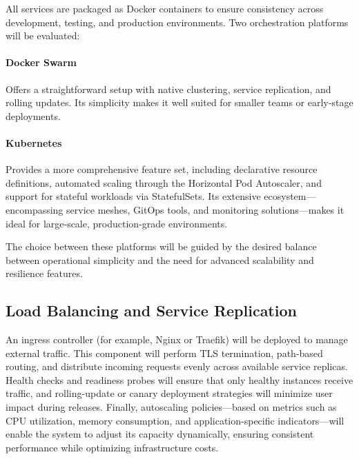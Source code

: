 All services are packaged as Docker containers to ensure consistency across development, testing, and production environments. Two orchestration platforms will be evaluated:

\paragraph{Docker Swarm}  
Offers a straightforward setup with native clustering, service replication, and rolling updates. Its simplicity makes it well suited for smaller teams or early‐stage deployments.

\paragraph{Kubernetes}  
Provides a more comprehensive feature set, including declarative resource definitions, automated scaling through the Horizontal Pod Autoscaler, and support for stateful workloads via StatefulSets. Its extensive ecosystem—encompassing service meshes, GitOps tools, and monitoring solutions—makes it ideal for large‐scale, production‐grade environments.

The choice between these platforms will be guided by the desired balance between operational simplicity and the need for advanced scalability and resilience features.

\subsection{Load Balancing and Service Replication}

An ingress controller (for example, Nginx\cite{NGINX} or Traefik\cite{NGINX}) will be deployed to manage external traffic. This component will perform TLS termination, path-based routing, and distribute incoming requests evenly across available service replicas. Health checks and readiness probes will ensure that only healthy instances receive traffic, and rolling-update or canary deployment strategies will minimize user impact during releases. Finally, autoscaling policies—based on metrics such as CPU utilization, memory consumption, and application-specific indicators—will enable the system to adjust its capacity dynamically, ensuring consistent performance while optimizing infrastructure costs.  